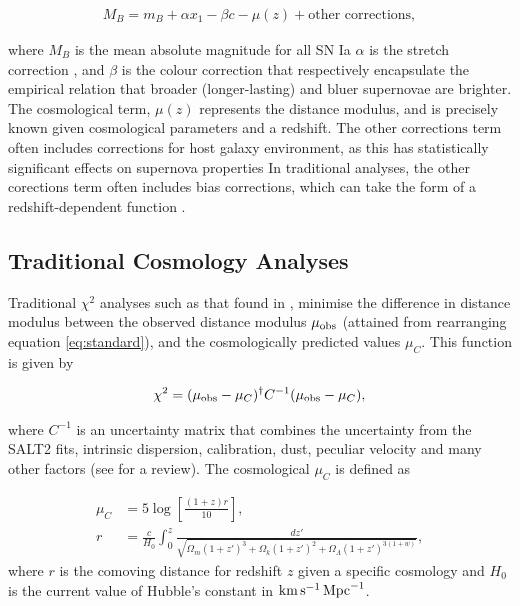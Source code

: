 \documentclass[a4paper,fleqn,usenatbib]{mnras}
\newcommand{\kmsmpc}{{\rm km}\,{\rm s}^{-1}\,{\rm Mpc}^{-1}}
\begin{document}
\begin{align}
M_B = m_B + \alpha x_1 - \beta c - \mu(z) + \text{other corrections}, \label{eq:standard}
\end{align}

where $M_B$ is the mean absolute magnitude for all SN Ia  $\alpha$ is the stretch correction \citep{Phillips1993, Phillips1999}, and $\beta$ is the colour correction \citep{Tripp1998} that respectively encapsulate the empirical relation that broader (longer-lasting) and bluer supernovae are brighter. The cosmological term, $\mu(z)$ represents the distance modulus, and is precisely known given cosmological parameters and a redshift. The $\text{other corrections}$ term often includes corrections for host galaxy environment, as this has statistically significant effects on supernova properties \citep{Kelly2010, Lampeitl2010, Sullivan2010, DAndrea2011, Gupta2011, Johansson2013, Rigault2013, Uddin2017} In traditional analyses, the other corections term often includes bias corrections, which can take the form of a redshift-dependent function \citep{Betoule2014}.

\subsection{Traditional Cosmology Analyses}

Traditional $\chi^2$ analyses such as that found in \citet{Riess1998, Perlmutter1999, Wood-Vasey2007, Kowalski2008, Kessler2009, Conley2011, Betoule2014}, minimise the difference in distance modulus between the observed distance modulus $\mu_{\rm obs}$ (attained from rearranging equation \eqref{eq:standard}), and the cosmologically predicted values $\mu_C$. This function is given by

\begin{align}
\chi^2 = (\mu_{\rm obs} - \mu_C)^\dagger C^{-1} (\mu_{\rm obs} - \mu_C),
\end{align}

where $C^{-1}$ is an uncertainty matrix that combines the uncertainty from the SALT2 fits, intrinsic dispersion, calibration, dust, peculiar velocity and many other factors (see \citet{Betoule2014} for a review). The cosmological $\mu_C$ is defined as

\begin{align}
\mu_C &= 5 \log\left[ \frac{(1+z)r}{10} \right],\\
r& =\frac{c}{H_0} \int_0^z \frac{dz'}{\sqrt{ \Omega_m (1+z')^3 + \Omega_k (1 + z')^2 + \Omega_\Lambda (1+z')^{3(1+w)}}}, \label{eq:mu0}
\end{align}
where $r$ is the comoving distance for redshift $z$ given a specific cosmology and $H_0$ is the current value of Hubble's constant in $\kmsmpc$.
\end{document}
